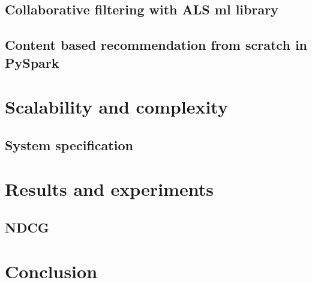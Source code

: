 \documentclass[12pt,english]{report}
\begin{document}
\section{Collaborative filtering with ALS ml library}
\section{Content based recommendation from scratch in PySpark}

\chapter{Scalability and complexity}\label{ch:scalability}
\section{System specification}
\chapter{Results and experiments}\label{ch:results}
\section{NDCG}
\chapter{Conclusion}\label{ch:conclusion}


\lstlistoflistings


\end{document}
